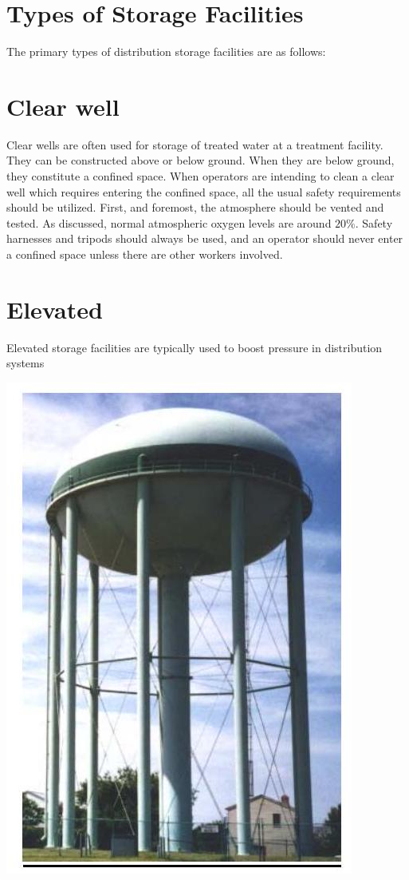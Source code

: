 \documentclass[10pt]{article}
\begin{document}
\section{Types of Storage Facilities}
The primary types of distribution storage facilities are as follows:

\section{Clear well}
Clear wells are often used for storage of treated water at a treatment facility. They can be constructed above or below ground. When they are below ground, they constitute a confined space. When operators are intending to clean a clear well which requires entering the confined space, all the usual safety requirements should be utilized. First, and foremost, the atmosphere should be vented and tested. As discussed, normal atmospheric oxygen levels are around $20 \%$. Safety harnesses and tripods should always be used, and an operator should never enter a confined space unless there are other workers involved.

\section{Elevated}
Elevated storage facilities are typically used to boost pressure in distribution systems

\includegraphics[max width=\textwidth]{ElevatedTank}
\end{document}
